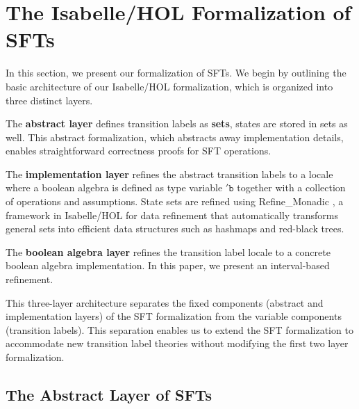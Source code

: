 \section{The Isabelle/HOL Formalization of SFTs}
\label{sec:formalization}


In this section, we present our formalization of SFTs. We begin by outlining the basic architecture of our Isabelle/HOL formalization, which is organized into three distinct layers.

The \textbf{abstract layer} defines transition labels as \textbf{sets}, states are stored in sets as well.  This abstract formalization, which abstracts away implementation details, enables straightforward correctness proofs for SFT operations.

The \textbf{implementation layer} refines the abstract transition labels to a locale where a boolean algebra is defined as type variable $'\texttt{b}$ together with a collection of operations and assumptions. State sets are refined using Refine\_Monadic \cite{Refine_Monadic-AFP}, a framework in Isabelle/HOL for data refinement that automatically transforms general sets into efficient data structures such as hashmaps and red-black trees.

The \textbf{boolean algebra layer} refines the transition label locale to a concrete boolean algebra implementation. In this paper, we present an interval-based refinement.

This three-layer architecture separates the fixed components (abstract and implementation layers) of the SFT formalization from the variable components (transition labels). This separation enables us to extend the SFT formalization to accommodate new transition label theories without modifying the first two layer formalization.


\subsection{The Abstract Layer of SFTs}
\label{sec:abstract-layer}

